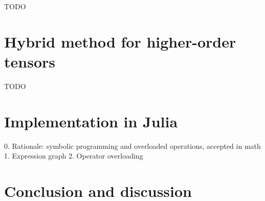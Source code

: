\documentclass[conference]{IEEEtran}
\begin{document}
TODO

\section{Hybrid method for higher-order tensors}

TODO

\section{Implementation in Julia}

0. Rationale: symbolic programming and overloaded operations, accepted in math
1. Expression graph
2. Operator overloading

\newpage

\section{Conclusion and discussion}





 




\end{document}

